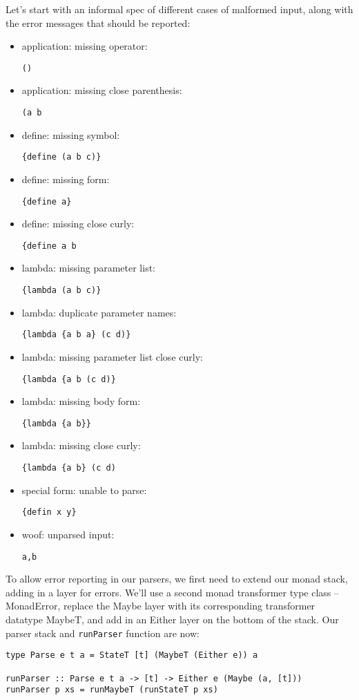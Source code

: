 \documentclass{tmr}
\begin{document}
Let's start with an informal spec of different cases of malformed input, along 
with the error messages that should be reported: 
\begin{itemize}
  \item application: missing operator:  \begin{verbatim}()\end{verbatim}
  \item application: missing close parenthesis:  \begin{verbatim}(a b\end{verbatim}
  \item define: missing symbol:  \begin{verbatim}{define (a b c)}\end{verbatim}
  \item define: missing form:  \begin{verbatim}{define a}\end{verbatim}
  \item define: missing close curly:  \begin{verbatim}{define a b\end{verbatim}
  \item lambda: missing parameter list:  \begin{verbatim}{lambda (a b c)}\end{verbatim}
  \item lambda: duplicate parameter names:  \begin{verbatim}{lambda {a b a} (c d)}\end{verbatim}
  \item lambda: missing parameter list close curly:  \begin{verbatim}{lambda {a b (c d)}\end{verbatim}
  \item lambda: missing body form:  \begin{verbatim}{lambda {a b}}\end{verbatim}
  \item lambda: missing close curly:  \begin{verbatim}{lambda {a b} (c d)\end{verbatim}
  \item special form: unable to parse:  \begin{verbatim}{defin x y}\end{verbatim}
  \item woof: unparsed input:  \begin{verbatim}a,b\end{verbatim}
\end{itemize}
To allow error reporting in our parsers, we first need to extend our monad stack, 
adding in a layer for errors.  We'll use a second monad transformer type class 
-- MonadError, replace the Maybe layer with its corresponding transformer datatype 
MaybeT, and add in an Either layer on the bottom of the stack.  Our parser stack 
and \verb+runParser+ function are now:
\begin{verbatim}
type Parse e t a = StateT [t] (MaybeT (Either e)) a

runParser :: Parse e t a -> [t] -> Either e (Maybe (a, [t]))
runParser p xs = runMaybeT (runStateT p xs)
\end{verbatim}
\end{document}

